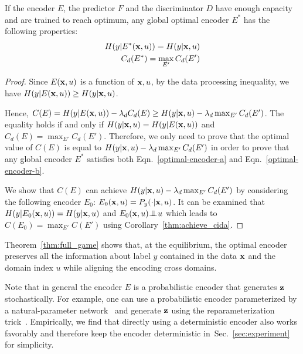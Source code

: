 \documentclass{article}
\newcommand{\secref}[1]{Sec.~\ref{#1}}
\newcommand{\thmref}[1]{Theorem~\ref{#1}}
\newcommand{\crlref}[1]{Corollary~\ref{#1}}
\newcommand{\eqnref}[1]{Eqn.~\ref{#1}}
\begin{document}
\begin{theorem} \label{thm:full_game} If the encoder $E$, the predictor $F$ and the discriminator $D$ have enough capacity and are trained to reach optimum, any global optimal encoder $E^*$ has the
following properties:
\begin{subequations}
\begin{align}
	H(y|E^*({\bf x}, u)) = H(y|{\bf x}, u) \label{optimal-encoder-a}\\
C_d(E^*) = \max_{E'} C_d(E') \label{optimal-encoder-b}
\end{align}
\end{subequations}
\end{theorem}
\begin{proof}
	Since $E({\bf x}, u)$ is a function of ${\bf x}, u$, by the data processing inequality, we have $H(y|E({\bf x}, u)) \geq H(y|{\bf x}, u)$.

	
	Hence, $C(E) = H(y|E({\bf x}, u)) - \lambda_d C_d(E) \geq H(y|{\bf x},u) - \lambda_d \max_{E'} C_d(E')$. The equality holds if and only if $H(y|{\bf x},u)=H(y|E({\bf x},u))$ and $C_d(E)=\max_{E'} C_d(E')$. Therefore, we only need to prove that the optimal value of $C(E)$ is equal to $H(y|{\bf x},u) - \lambda_d \max_{E'} C_d(E')$ in order to prove that any global encoder $E^*$ satisfies both \eqnref{optimal-encoder-a} and \eqnref{optimal-encoder-b}.
	
	We show that $C(E)$ can achieve $H(y|{\bf x},u) - \lambda_d \max_{E'} C_d(E')$ by considering the following encoder $E_0$: $E_0({\bf x},u) = P_y(\cdot|{\bf x}, u)$. It can be examined that $H(y|E_0({\bf x},u)) = H(y|{\bf x},u)$ and $E_0({\bf x},u) {\;\bot\!\!\!\!\!\!\bot\;} u$ which leads to $C(E_0)=\max_{E'}C(E')$ using \crlref{thm:achieve_cida}.
\end{proof}

\thmref{thm:full_game} shows that, at the equilibrium, the optimal encoder preserves all the information about label $y$ contained in the data ${\bf x}$ and the domain index $u$ while aligning the encoding cross domains.

Note that in general the encoder $E$ is a probabilistic encoder that generates ${\bf z}$ stochastically. For example, one can use a probabilistic encoder parameterized by a natural-parameter network~\cite{NPN} and generate ${\bf z}$ using the reparameterization trick~\cite{VAE}. Empirically, we find that directly using a deterministic encoder also works favorably and therefore keep the encoder deterministic in~\secref{sec:experiment} for simplicity. 
\end{document}
